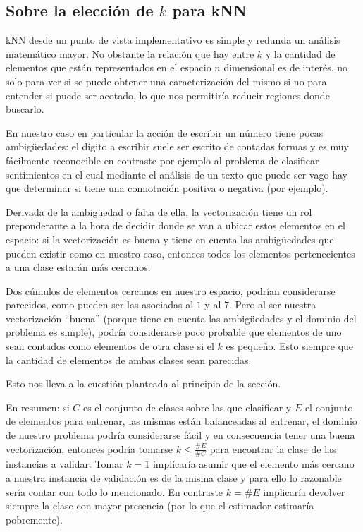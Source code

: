 \subsection{Sobre la elección de $k$ para kNN}\label{desarrollosobreknn}

kNN desde un punto de vista implementativo es simple y redunda un análisis matemático mayor. No obstante la relación que hay entre $k$ y la cantidad de elementos que están representados en el espacio $n$ dimensional es de interés, no solo para ver si se puede obtener una caracterización del mismo si no para entender si puede ser acotado, lo que nos permitiría reducir regiones donde buscarlo.

En nuestro caso en particular la acción de escribir un número tiene pocas ambigüedades: el dígito a escribir suele ser escrito de contadas formas y es muy fácilmente reconocible en contraste por ejemplo al problema de clasificar sentimientos en el cual mediante el análisis de un texto que puede ser vago hay que determinar si tiene una connotación positiva o negativa (por ejemplo).

Derivada de la ambigüedad o falta de ella, la vectorización tiene un rol preponderante a la hora de decidir donde se van a ubicar estos elementos en el espacio: si la vectorización es buena y tiene en cuenta las ambigüedades que pueden existir como en nuestro caso, entonces todos los elementos pertenecientes a una clase estarán más cercanos.

Dos cúmulos de elementos cercanos en nuestro espacio, podrían considerarse parecidos, como pueden ser las asociadas al $1$ y al $7$. Pero al ser nuestra vectorización ``buena'' (porque tiene en cuenta las ambigüedades y el dominio del problema es simple), podría considerarse poco probable que elementos de uno sean contados como elementos de otra clase si el $k$ es pequeño. Esto siempre que la cantidad de elementos de ambas clases sean parecidas.

Esto nos lleva a la cuestión planteada al principio de la sección.

En resumen: si $C$ es el conjunto de clases sobre las que clasificar y $E$ el conjunto de elementos para entrenar, las mismas están balanceadas al entrenar, el dominio de nuestro problema podría considerarse fácil y en consecuencia tener una buena vectorización, entonces podría tomarse $k\leq\frac{\#E}{\#C}$ para encontrar la clase de las instancias a validar. Tomar $k=1$ implicaría asumir que el elemento más cercano a nuestra instancia de validación es de la misma clase y para ello lo razonable sería contar con todo lo mencionado. En contraste $k=\#E$  implicaría devolver siempre la clase con mayor presencia (por lo que el estimador estimaría pobremente).

